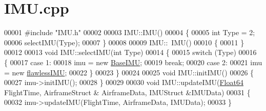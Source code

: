 \hypertarget{_i_m_u_8cpp_source}{}\section{I\+M\+U.\+cpp}
\label{_i_m_u_8cpp_source}

\begin{DoxyCode}
00001 \textcolor{preprocessor}{#include "IMU.h"}
00002 
00003 IMU::IMU()
00004 \{
00005     \textcolor{keywordtype}{int} Type = 2;
00006     selectIMU(Type);
00007 \}
00008 
00009 IMU::~IMU()
00010 \{
00011 \}
00012 
00013 \textcolor{keywordtype}{void} IMU::selectIMU(\textcolor{keywordtype}{int} Type)
00014 \{
00015     \textcolor{keywordflow}{switch} (Type)
00016     \{
00017     \textcolor{keywordflow}{case} 1:
00018         imu = \textcolor{keyword}{new} \hyperlink{class_base_i_m_u}{BaseIMU};
00019         \textcolor{keywordflow}{break};
00020     \textcolor{keywordflow}{case} 2:
00021         imu = \textcolor{keyword}{new} \hyperlink{classflawless_i_m_u}{flawlessIMU};
00022     \}
00023 \}
00024 
00025 \textcolor{keywordtype}{void} IMU::initIMU()
00026 \{
00027     imu->initIMU();
00028 \}
00029 
00030 \textcolor{keywordtype}{void} IMU::updateIMU(\hyperlink{group___tools_ga3f1431cb9f76da10f59246d1d743dc2c}{Float64} FlightTime, AirframeStruct & AirframeData, IMUStruct &IMUData)
00031 \{
00032     imu->updateIMU(FlightTime, AirframeData, IMUData);
00033 \}
\end{DoxyCode}
